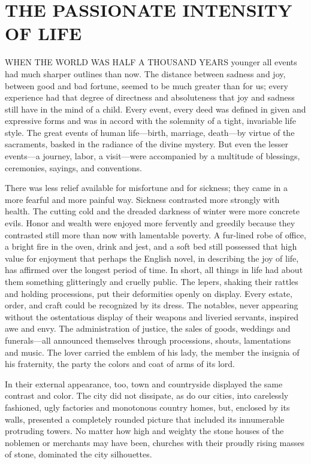 \chapter{THE PASSIONATE INTENSITY OF LIFE}

WHEN THE WORLD WAS HALF A THOUSAND YEARS younger all events had much
sharper outlines than now. The distance between sadness and joy, between
good and bad fortune, seemed to be much greater than for us; every
experience had that degree of directness and absoluteness that joy and
sadness still have in the mind of a child. Every event, every deed was
defined in given and expressive forms and was in accord with the
solemnity of a tight, invariable life style. The great events of human
life---birth, marriage, death---by virtue of the sacraments, basked in
the radiance of the divine mystery. But even the lesser events---a
journey, labor, a visit---were accompanied by a multitude of blessings,
ceremonies, sayings, and conventions.

There was less relief available for misfortune and for sickness; they
came in a more fearful and more painful way. Sickness contrasted more
strongly with health. The cutting cold and the dreaded darkness of
winter were more concrete evils. Honor and wealth were enjoyed more
fervently and greedily because they contrasted still more than now with
lamentable poverty. A fur-lined robe of office, a bright fire in the
oven, drink and jest, and a soft bed still possessed that high value for
enjoyment that perhaps the English novel, in describing the joy of life,
has affirmed over the longest period of time. In short, all things in
life had about them something glitteringly and cruelly public. The
lepers, shaking their rattles and holding processions, put their
deformities openly on display. Every estate, order, and craft could be
recognized by its dress. The notables, never appearing without the
ostentatious display of their weapons and liveried servants, inspired
awe and envy. The administration of justice, the sales of goods,
weddings and funerals---all announced themselves through processions,
shouts, lamentations and music. The lover carried the emblem of his
lady, the member
\protect\hypertarget{08_Chapter_One__THE_PASSIONATE_INTE.xhtmlux5cux23page_2}{}{}the
insignia of his fraternity, the party the colors and coat of arms of its
lord.

In their external appearance, too, town and countryside displayed the
same contrast and color. The city did not dissipate, as do our cities,
into carelessly fashioned, ugly factories and monotonous country homes,
but, enclosed by its walls, presented a completely rounded picture that
included its innumerable protruding towers. No matter how high and
weighty the stone houses of the noblemen or merchants may have been,
churches with their proudly rising masses of stone, dominated the city
silhouettes.

